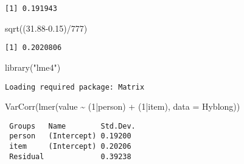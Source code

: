 \documentclass[
]{book}
\newenvironment{Shaded}{\begin{snugshade}}{\end{snugshade}}
\newcommand{\AttributeTok}[1]{\textcolor[rgb]{0.77,0.63,0.00}{#1}}
\newcommand{\DecValTok}[1]{\textcolor[rgb]{0.00,0.00,0.81}{#1}}
\newcommand{\FloatTok}[1]{\textcolor[rgb]{0.00,0.00,0.81}{#1}}
\newcommand{\FunctionTok}[1]{\textcolor[rgb]{0.00,0.00,0.00}{#1}}
\newcommand{\NormalTok}[1]{#1}
\newcommand{\OtherTok}[1]{\textcolor[rgb]{0.56,0.35,0.01}{#1}}
\newcommand{\SpecialCharTok}[1]{\textcolor[rgb]{0.00,0.00,0.00}{#1}}
\newcommand{\StringTok}[1]{\textcolor[rgb]{0.31,0.60,0.02}{#1}}
\begin{document}
\begin{verbatim}
[1] 0.191943
\end{verbatim}

\begin{Shaded}
\begin{Highlighting}[]
\FunctionTok{sqrt}\NormalTok{((}\FloatTok{31.88{-}0.15}\NormalTok{)}\SpecialCharTok{/}\DecValTok{777}\NormalTok{)}
\end{Highlighting}
\end{Shaded}

\begin{verbatim}
[1] 0.2020806
\end{verbatim}

\begin{Shaded}
\begin{Highlighting}[]
\FunctionTok{library}\NormalTok{(}\StringTok{"lme4"}\NormalTok{)}
\end{Highlighting}
\end{Shaded}

\begin{verbatim}
Loading required package: Matrix
\end{verbatim}

\begin{Shaded}
\begin{Highlighting}[]
\FunctionTok{VarCorr}\NormalTok{(}\FunctionTok{lmer}\NormalTok{(value }\SpecialCharTok{\textasciitilde{}}\NormalTok{ (}\DecValTok{1}\SpecialCharTok{|}\NormalTok{person) }\SpecialCharTok{+}\NormalTok{ (}\DecValTok{1}\SpecialCharTok{|}\NormalTok{item), }\AttributeTok{data =}\NormalTok{ Hyblong))}
\end{Highlighting}
\end{Shaded}

\begin{verbatim}
 Groups   Name        Std.Dev.
 person   (Intercept) 0.19200 
 item     (Intercept) 0.20206 
 Residual             0.39238 
\end{verbatim}

\begin{Shaded}
\end{Shaded}
\end{document}
